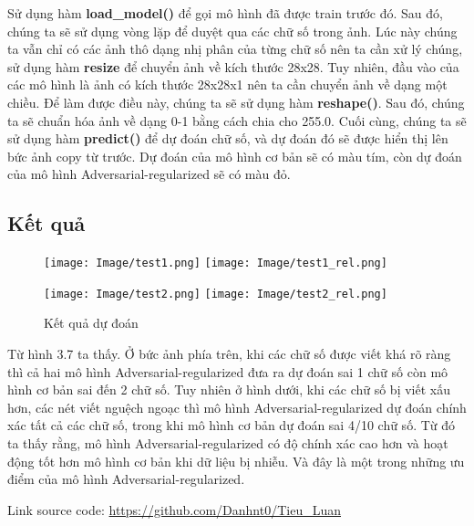 Sử dụng hàm \textbf{load\_model()} để gọi mô hình đã được train trước đó. Sau đó, chúng ta sẽ sử dụng vòng lặp để duyệt qua các chữ số trong ảnh.
Lúc này chúng ta vẫn chỉ có các ảnh thô dạng nhị phân của từng chữ số nên ta cần xử lý chúng, sử dụng hàm \textbf{resize} để chuyển ảnh về kích thước 28x28.
Tuy nhiên, đầu vào của các mô hình là ảnh có kích thước 28x28x1 nên ta cần chuyển ảnh về dạng một chiều. Để làm được điều này, chúng ta sẽ sử dụng hàm \textbf{reshape()}.
Sau đó, chúng ta sẽ chuẩn hóa ảnh về dạng 0-1 bằng cách chia cho 255.0. Cuối cùng, chúng ta sẽ sử dụng hàm \textbf{predict()} để dự đoán chữ số, và dự đoán đó sẽ được hiển 
thị lên bức ảnh copy từ trước. Dự đoán của mô hình cơ bản sẽ có màu tím, còn dự đoán của mô hình Adversarial-regularized sẽ có màu đỏ.

\subsection{Kết quả}

\begin{figure}[h]
    \centering
    \texttt{[image: Image/test1.png]}
    \vspace{1.5cm}
    \texttt{[image: Image/test1\_rel.png]}
   
    \texttt{[image: Image/test2.png]}
    \texttt{[image: Image/test2\_rel.png]}
    \caption{Kết quả dự đoán}
    \label{fig 3.7:Kết quả dự đoán}
\end{figure}

Từ hình 3.7 ta thấy. Ở bức ảnh phía trên, khi các chữ số được viết khá rõ ràng thì cả hai mô hình Adversarial-regularized đưa ra dự đoán sai 1 chữ số còn mô hình cơ bản sai đến 2 chữ số.
Tuy nhiên ở hình dưới, khi các chữ số bị viết xấu hơn, các nét viết nguệch ngoạc thì mô hình Adversarial-regularized dự đoán chính xác tất cả các chữ số, trong khi mô hình cơ bản dự đoán sai 4/10 chữ số.
Từ đó ta thấy rằng, mô hình Adversarial-regularized có độ chính xác cao hơn và hoạt động tốt hơn mô hình cơ bản khi dữ liệu bị nhiễu. Và đây là một trong những ưu điểm của mô hình Adversarial-regularized.


Link source code: \url{https://github.com/Danhnt0/Tieu_Luan}